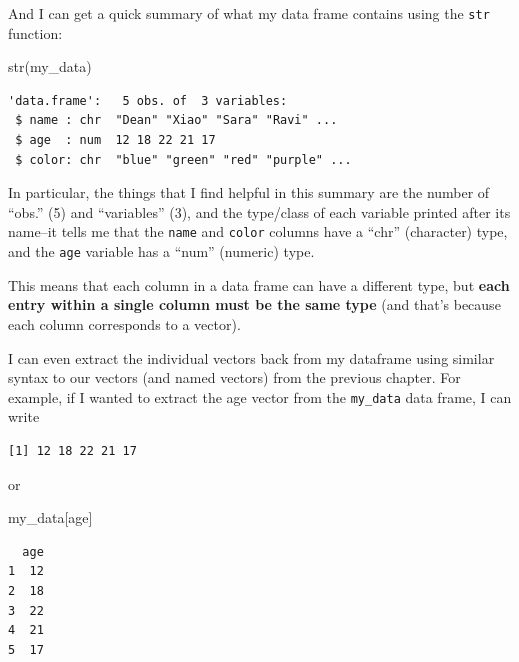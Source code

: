 \documentclass[
  letterpaper,
  DIV=11,
  numbers=noendperiod]{scrreprt}
\newenvironment{Shaded}{\begin{snugshade}}{\end{snugshade}}
\newcommand{\FunctionTok}[1]{\textcolor[rgb]{0.28,0.35,0.67}{#1}}
\newcommand{\NormalTok}[1]{\textcolor[rgb]{0.00,0.23,0.31}{#1}}
\newcommand{\SpecialCharTok}[1]{\textcolor[rgb]{0.37,0.37,0.37}{#1}}
\newcommand{\StringTok}[1]{\textcolor[rgb]{0.13,0.47,0.30}{#1}}
\begin{document}
And I can get a quick summary of what my data frame contains using the
\texttt{str} function:

\begin{Shaded}
\begin{Highlighting}[]
\FunctionTok{str}\NormalTok{(my\_data)}
\end{Highlighting}
\end{Shaded}

\begin{verbatim}
'data.frame':   5 obs. of  3 variables:
 $ name : chr  "Dean" "Xiao" "Sara" "Ravi" ...
 $ age  : num  12 18 22 21 17
 $ color: chr  "blue" "green" "red" "purple" ...
\end{verbatim}

In particular, the things that I find helpful in this summary are the
number of ``obs.'' (5) and ``variables'' (3), and the type/class of each
variable printed after its name--it tells me that the \texttt{name} and
\texttt{color} columns have a ``chr'' (character) type, and the
\texttt{age} variable has a ``num'' (numeric) type.

This means that each column in a data frame can have a different type,
but \textbf{each entry within a single column must be the same type}
(and that's because each column corresponds to a vector).

I can even extract the individual vectors back from my dataframe using
similar syntax to our vectors (and named vectors) from the previous
chapter. For example, if I wanted to extract the age vector from the
\texttt{my\_data} data frame, I can write

\begin{Shaded}
\end{Shaded}

\begin{verbatim}
[1] 12 18 22 21 17
\end{verbatim}

or

\begin{Shaded}
\begin{Highlighting}[]
\NormalTok{my\_data[}\StringTok{\textquotesingle{}age\textquotesingle{}}\NormalTok{]}
\end{Highlighting}
\end{Shaded}

\begin{verbatim}
  age
1  12
2  18
3  22
4  21
5  17
\end{verbatim}
\end{document}
